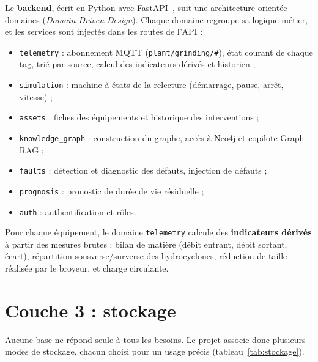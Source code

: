 Le \textbf{backend}, écrit en Python avec FastAPI~\cite{fastapi}, suit une architecture orientée domaines (\textit{Domain-Driven Design}). Chaque domaine regroupe sa logique métier, et les services sont injectés dans les routes de l'API :
\begin{itemize}
  \item \texttt{telemetry} : abonnement MQTT (\texttt{plant/grinding/\#}), état courant de chaque tag, trié par source, calcul des indicateurs dérivés et historien ;
  \item \texttt{simulation} : machine à états de la relecture (démarrage, pause, arrêt, vitesse) ;
  \item \texttt{assets} : fiches des équipements et historique des interventions ;
  \item \texttt{knowledge\_graph} : construction du graphe, accès à Neo4j et copilote Graph RAG ;
  \item \texttt{faults} : détection et diagnostic des défauts, injection de défauts ;
  \item \texttt{prognosis} : pronostic de durée de vie résiduelle ;
  \item \texttt{auth} : authentification et rôles.
\end{itemize}

Pour chaque équipement, le domaine \texttt{telemetry} calcule des \textbf{indicateurs dérivés} à partir des mesures brutes : bilan de matière (débit entrant, débit sortant, écart), répartition sousverse/surverse des hydrocyclones, réduction de taille réalisée par le broyeur, et charge circulante.

\section{Couche 3 : stockage}
Aucune base ne répond seule à tous les besoins. Le projet associe donc plusieurs modes de stockage, chacun choisi pour un usage précis (tableau~\ref{tab:stockage}).

